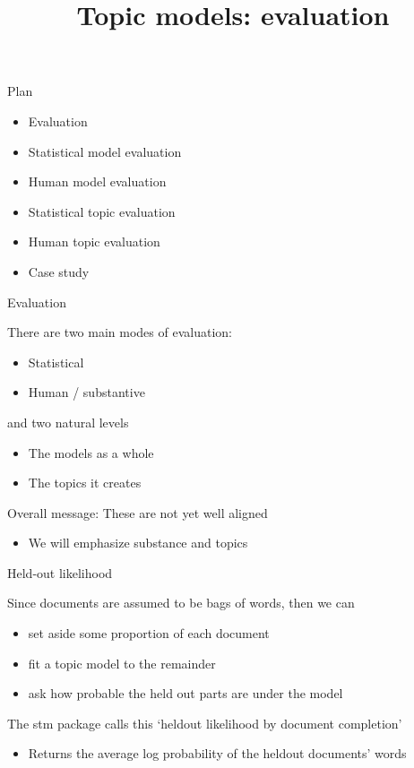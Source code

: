 \documentclass{hertieteaching}
\title{Topic models: evaluation}
\begin{document}
\maketitle

\begin{frame}{Plan}

\begin{itemize}
  \item Evaluation
  \item Statistical model evaluation
  \item Human model evaluation
  \item Statistical topic evaluation
  \item Human topic evaluation
  \item Case study
\end{itemize}


\end{frame}

\begin{frame}{Evaluation}

There are two main modes of evaluation:
\begin{itemize}
  \item Statistical
  \item Human / substantive
\end{itemize}
and two natural levels
\begin{itemize}
  \item The models as a whole
  \item The topics it creates
\end{itemize}

\bigskip
Overall message: These are not yet well aligned
\begin{itemize}
  \item We will emphasize substance and topics 
\end{itemize}




\end{frame}

\begin{frame}{Held-out likelihood}

Since documents are assumed to be bags of words, then we can
\begin{itemize}
  \item set aside some proportion of each document
  \item fit a topic model to the remainder
  \item ask how probable the held out parts are under the model
\end{itemize}
The \textsf{stm} package calls this `heldout likelihood by document completion'
\begin{itemize}
  \item Returns the average log probability of the heldout documents' words
\end{itemize}

\end{frame}
\end{document}
